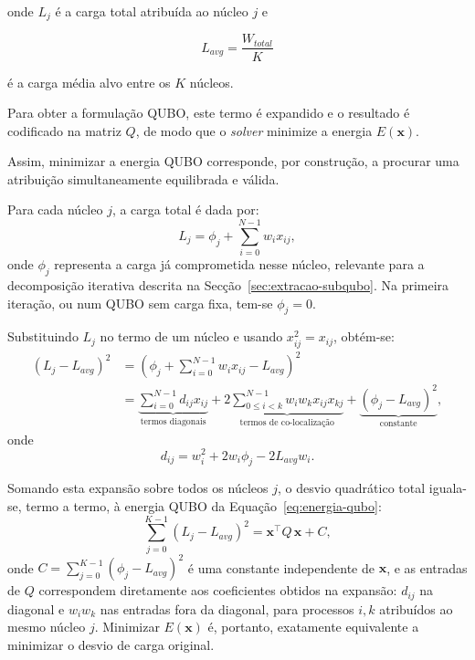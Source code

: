 onde $L_j$ é a carga total atribuída ao núcleo $j$ e

\begin{equation}
    L_{avg} = \frac{W_{total}}{K}
\end{equation}

é a carga média alvo entre os $K$ núcleos.

Para obter a formulação \acs{QUBO}, este termo é expandido e o resultado é codificado na matriz $Q$, de modo que o \textit{solver}
minimize a energia $E(\mathbf{x})$.

Assim, minimizar a energia \acs{QUBO} corresponde, por construção, a procurar uma atribuição
simultaneamente equilibrada e válida.

Para cada núcleo $j$, a carga total é dada por:
\begin{equation}
    L_j = \phi_j + \sum_{i=0}^{N-1} w_i x_{ij},
\end{equation}
onde $\phi_j$ representa a carga já comprometida nesse núcleo, relevante para a
decomposição iterativa descrita na Secção~\ref{sec:extracao-subqubo}. Na primeira iteração,
ou num \acs{QUBO} sem carga fixa, tem-se
$\phi_j = 0$.

Substituindo $L_j$ no termo de um núcleo e usando $x_{ij}^2=x_{ij}$, obtém-se:
\begin{equation}
\begin{aligned}
(L_j - L_{avg})^2
&= \left(\phi_j + \sum_{i=0}^{N-1}w_ix_{ij} - L_{avg}\right)^2 \\
&= \underbrace{\sum_{i=0}^{N-1} d_{ij}x_{ij}}_{\text{termos diagonais}}
 + 2\underbrace{\sum_{0 \leq i < k}^{N-1} w_iw_kx_{ij}x_{kj}}_{\text{termos de co-localização}}
 + \underbrace{(\phi_j - L_{avg})^2}_{\text{constante}},
\end{aligned}
\end{equation}
onde
\begin{equation}
    d_{ij}=w_i^2 + 2w_i\phi_j - 2L_{avg}w_i.
\end{equation}

Somando esta expansão sobre todos os núcleos $j$, o desvio quadrático total iguala-se,
termo a termo, à energia \acs{QUBO} da Equação~\ref{eq:energia-qubo}:
\begin{equation}
    \sum_{j=0}^{K-1}(L_j - L_{avg})^2 = \mathbf{x}^\top Q\, \mathbf{x} + C,
\end{equation}
onde $C = \sum_{j=0}^{K-1}(\phi_j - L_{avg})^2$ é uma constante independente de $\mathbf{x}$,
e as entradas de $Q$ correspondem diretamente aos coeficientes obtidos na expansão: $d_{ij}$
na diagonal e $w_iw_k$ nas entradas fora da diagonal, para processos $i,k$ atribuídos ao
mesmo núcleo $j$. Minimizar $E(\mathbf{x})$ é, portanto, exatamente equivalente a minimizar
o desvio de carga original.


